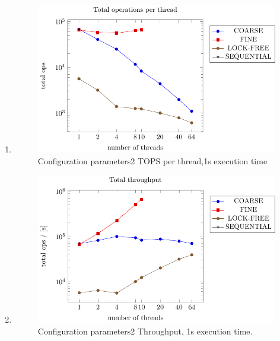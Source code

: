 \documentclass{article}
\begin{document}
\begin{enumerate}
    \item
    \begin{figure}[H]
        \centering
        \includegraphics{../plots/parameters2_1s_per_thread.pdf}
        \caption{Configuration parameters2 TOPS per thread,1s execution time}
       
        \label{fig:parameters2_1s_per_thread}
    \end{figure}


    \item 
    \begin{figure}[H]
        \centering
        \includegraphics{../plots/parameters2_1s_throughput.pdf}
        \caption{Configuration parameters2 Throughput, 1s execution time.}
        \label{fig:larameters1_1s_throughput}
    \end{figure}


\end{enumerate}
\end{document}
